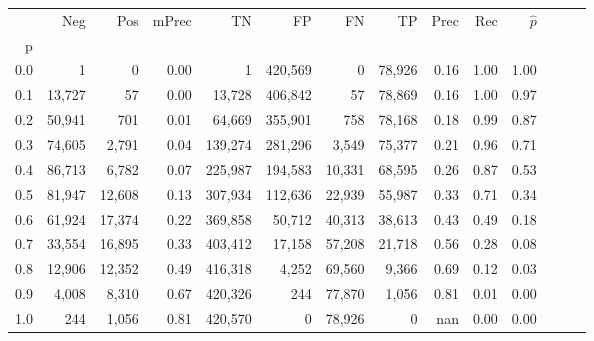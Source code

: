 \begin{tabular}{rrrrrrrrrrrrrr}
\toprule
{} &     Neg &     Pos & mPrec &       TN &       FP &      FN &      TP &  Prec &   Rec & $\hat{p}$ \\
p   &         &         &       &          &          &         &         &       &       &           \\
\midrule
0.0 &       1 &       0 &  0.00 &        1 &  420,569 &       0 &  78,926 &  0.16 &  1.00 &      1.00 \\
0.1 &  13,727 &      57 &  0.00 &   13,728 &  406,842 &      57 &  78,869 &  0.16 &  1.00 &      0.97 \\
0.2 &  50,941 &     701 &  0.01 &   64,669 &  355,901 &     758 &  78,168 &  0.18 &  0.99 &      0.87 \\
0.3 &  74,605 &   2,791 &  0.04 &  139,274 &  281,296 &   3,549 &  75,377 &  0.21 &  0.96 &      0.71 \\
0.4 &  86,713 &   6,782 &  0.07 &  225,987 &  194,583 &  10,331 &  68,595 &  0.26 &  0.87 &      0.53 \\
0.5 &  81,947 &  12,608 &  0.13 &  307,934 &  112,636 &  22,939 &  55,987 &  0.33 &  0.71 &      0.34 \\
0.6 &  61,924 &  17,374 &  0.22 &  369,858 &   50,712 &  40,313 &  38,613 &  0.43 &  0.49 &      0.18 \\
0.7 &  33,554 &  16,895 &  0.33 &  403,412 &   17,158 &  57,208 &  21,718 &  0.56 &  0.28 &      0.08 \\
0.8 &  12,906 &  12,352 &  0.49 &  416,318 &    4,252 &  69,560 &   9,366 &  0.69 &  0.12 &      0.03 \\
0.9 &   4,008 &   8,310 &  0.67 &  420,326 &      244 &  77,870 &   1,056 &  0.81 &  0.01 &      0.00 \\
1.0 &     244 &   1,056 &  0.81 &  420,570 &        0 &  78,926 &       0 &   nan &  0.00 &      0.00 \\
\bottomrule
\end{tabular}
